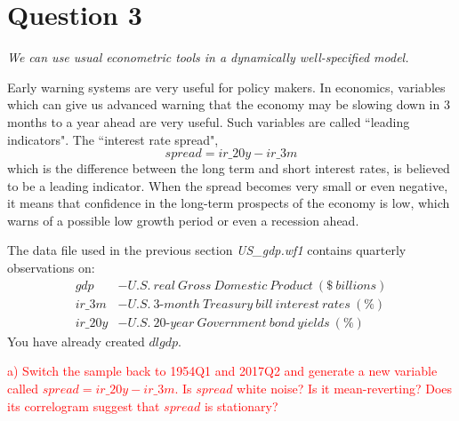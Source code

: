 \documentclass[12pt]{report}
\begin{document}
\newpage
\section*{Question 3}
\noindent \textit{We can use usual econometric tools in a dynamically well-specified model.}

\noindent Early warning systems are very useful for policy makers. In economics, variables which can give us advanced warning that the economy may be slowing down in 3 months to a year ahead are very useful. Such variables are called ``leading indicators". The ``interest rate spread", $$spread = ir\_20y - ir\_3m$$ which is the difference between the long term and short interest rates, is believed to be a leading indicator.  When the spread becomes very small or even negative, it means that confidence in the long-term prospects of the economy is low, which warns of a possible low growth period or even a recession ahead. 

\noindent The data file used in the previous section \textit{US\_gdp.wf1} contains quarterly observations on: 
\begin{align*}
gdp &- U.S.\ real\ Gross\ Domestic\ Product\ (\$\ billions)\\
ir\_3m &- U.S.\ 3\text{-}month\ Treasury\ bill\ interest\ rates\ (\%) \\
ir\_20y &- U.S.\ 20\text{-}year\ Government\ bond\ yields\ (\%)
\end{align*}
\noindent You have already created $dlgdp$.

\noindent \textcolor{red}{a) Switch the sample back to 1954Q1 and 2017Q2 and generate a new variable called $spread = ir\_20y - ir\_3m$. Is $spread$ white noise? Is it mean-reverting? Does its correlogram suggest that $spread$ is stationary?}
\end{document}
